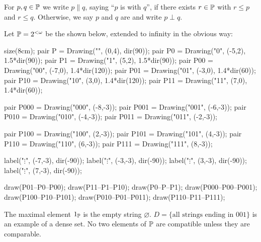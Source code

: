 \begin{definition}
	For $p,q \in \mathbb P$ we write $p \parallel q$,
	saying ``$p$ is  with $q$'',
	if there exists $r \in \mathbb P$ with $r \le p$ and $r \le q$.
	Otherwise, we say $p$ and $q$ are 
	and write $p \perp q$.
\end{definition}
\begin{example}
	Let $\mathbb P = 2^{<\omega}$ be the  shown below,
	extended to infinity in the obvious way:
	\begin{center}
		\begin{asy}
			size(8cm);
			pair P = Drawing("\varnothing", (0,4), dir(90));
			pair P0 = Drawing("0", (-5,2), 1.5*dir(90));
			pair P1 = Drawing("1", (5,2),  1.5*dir(90));
			pair P00 = Drawing("00", (-7,0), 1.4*dir(120));
			pair P01 = Drawing("01", (-3,0), 1.4*dir(60));
			pair P10 = Drawing("10", (3,0),  1.4*dir(120));
			pair P11 = Drawing("11", (7,0),  1.4*dir(60));

			pair P000 = Drawing("000", (-8,-3));
			pair P001 = Drawing("001", (-6,-3));
			pair P010 = Drawing("010", (-4,-3));
			pair P011 = Drawing("011", (-2,-3));

			pair P100 = Drawing("100", (2,-3));
			pair P101 = Drawing("101", (4,-3));
			pair P110 = Drawing("110", (6,-3));
			pair P111 = Drawing("111", (8,-3));

			label("$\vdots$", (-7,-3), dir(-90));
			label("$\vdots$", (-3,-3), dir(-90));
			label("$\vdots$", (3,-3), dir(-90));
			label("$\vdots$", (7,-3), dir(-90));

			draw(P01--P0--P00);
			draw(P11--P1--P10);
			draw(P0--P--P1);
			draw(P000--P00--P001);
			draw(P100--P10--P101);
			draw(P010--P01--P011);
			draw(P110--P11--P111);
		\end{asy}
	\end{center}

	\begin{enumerate}[(a)]
		\ii The maximal element $1_\mathbb P$ is the empty string $\varnothing$.
		\ii $D = \{\text{all strings ending in $001$}\}$ is an example of a dense set.
		\ii No two elements of $\mathbb P$ are compatible unless they are comparable.
	\end{enumerate}
\end{example}


